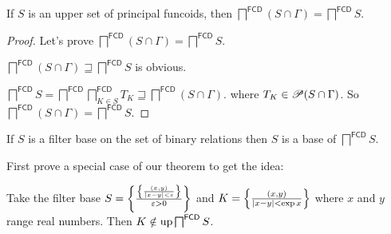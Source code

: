 \begin{lem}
If $S$ is an upper set of principal funcoids, then
$\bigsqcap^{\mathsf{FCD}} (S\cap\Gamma)=\bigsqcap^{\mathsf{FCD}} S$.
\end{lem}

\begin{proof}
  Let's prove $\bigsqcap^{\mathsf{FCD}} (S\cap\Gamma) = \bigsqcap^{\mathsf{FCD}} S$.
  
  $\bigsqcap^{\mathsf{FCD}} (S\cap\Gamma) \sqsupseteq \bigsqcap^{\mathsf{FCD}} S$ is obvious.
  
  $\bigsqcap^{\mathsf{FCD}} S = \bigsqcap^{\mathsf{FCD}} \bigsqcap^{\mathsf{FCD}}_{K\in S} T_K \sqsupseteq \bigsqcap^{\mathsf{FCD}} (S\cap\Gamma)$.
  where $T_K\in\mathscr{P} (S\cap\Gamma)$.
  So $\bigsqcap^{\mathsf{FCD}} (S\cap\Gamma) = \bigsqcap^{\mathsf{FCD}} S$.
\end{proof}

\begin{thm}
  If $S$ is a filter base on the set of binary relations then $S$ is a base of
  $\bigsqcap^{\mathsf{FCD}} S$.
\end{thm}

First prove a special case of our theorem to get the idea:

\begin{example}
  Take the filter base $S = \left\{ \frac{
  \left\{ \frac{ (x, y) }{ | x - y | < \varepsilon }\right\}}{ \varepsilon > 0 }\right\}$ and $K = \left\{ \frac{ (x, y) }{
  | x - y | < \exp x }\right\}$ where $x$ and $y$ range real
  numbers. Then $K \notin \operatorname{up} \bigsqcap^{\mathsf{FCD}} S$.
\end{example}

